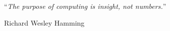 


\vspace*{0.2\textheight}

\noindent\enquote{\itshape The purpose of computing is insight, not numbers.}\bigbreak

\hfill Richard Wesley Hamming

\let\Oldabstractname\abstractname
\renewcommand{\abstractname}{Summary}

